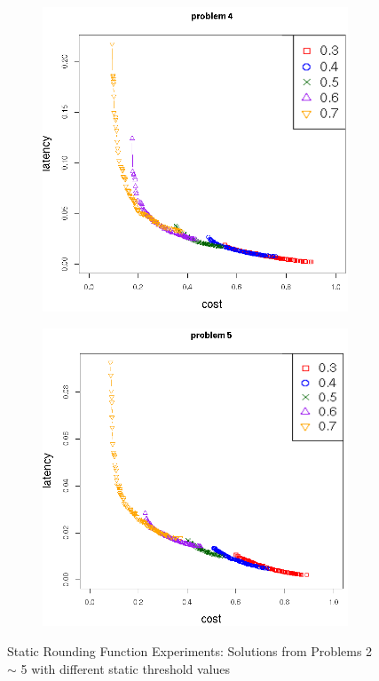 \begin{figure}[!h]
\begin{subfigure}{0.49\textwidth}
	   \caption{}
   \end{subfigure}
   \begin{subfigure}{0.49\textwidth}
       \includegraphics[width=\textwidth]{pics/static_threshold_problem_4.png}
	   \caption{}
   \end{subfigure}
   \begin{subfigure}{0.49\textwidth}
       \includegraphics[width=\textwidth]{pics/static_threshold_problem_5.png}
	   \caption{}
   \end{subfigure}
   \caption{Static Rounding Function Experiments: Solutions from Problems 2 $\sim$ 5 with different static threshold values}
   \label{fig:static}
\end{figure}


